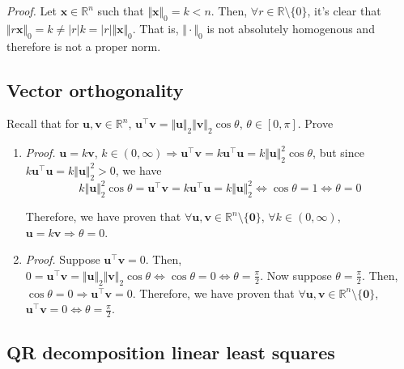 \documentclass{article}
\numberwithin{equation}{section}
\begin{document}
\textit{Proof.} Let $ \mathbf{x} \in \mathbb{R}^n $ such that
$ \Vert\mathbf{x}\Vert_0 = k < n $. Then, $ \forall r \in \mathbb{R} \setminus
\{0\} $, it's clear that $ \Vert r\mathbf{x}\Vert_0 = k \ne |r|k =
|r|\Vert\mathbf{x}\Vert_0 $. That is, $ \Vert\cdot\Vert_0 $ is not absolutely
homogenous and therefore is not a proper norm.

\subsection{Vector orthogonality}

Recall that for $ \mathbf{u}, \mathbf{v} \in \mathbb{R}^n $,
$ \mathbf{u}^\top\mathbf{v} = \Vert\mathbf{u}\Vert_2\Vert\mathbf{v}\Vert_2
\cos\theta $, $ \theta \in [0, \pi] $. Prove
\begin{enumerate}[label = \alph*.]
    \item
    \textit{Proof.} $ \mathbf{u} = k\mathbf{v} $, $ k \in (0, \infty)
    \Rightarrow \mathbf{u}^\top\mathbf{v} = k\mathbf{u}^\top\mathbf{u} =
    k\Vert\mathbf{u}\Vert_2^2\cos\theta $, but since $ k\mathbf{u}^\top
    \mathbf{u} = k\Vert\mathbf{u}\Vert_2^2 > 0 $, we have
    \begin{equation*}
        k\Vert\mathbf{u}\Vert_2^2\cos\theta = \mathbf{u}^\top\mathbf{v} =
        k\mathbf{u}^\top\mathbf{u} = k\Vert\mathbf{u}\Vert_2^2 \Leftrightarrow
        \cos\theta = 1 \Leftrightarrow \theta = 0
    \end{equation*}

    Therefore, we have proven that $ \forall \mathbf{u}, \mathbf{v} \in
    \mathbb{R}^n \setminus \{\mathbf{0}\} $, $ \forall k \in (0, \infty) $,
    $ \mathbf{u} = k\mathbf{v} \Rightarrow \theta = 0 $.

    \item
    \textit{Proof.} Suppose $ \mathbf{u}^\top\mathbf{v} = 0 $. Then,
    $ 0 = \mathbf{u}^\top\mathbf{v} = \Vert\mathbf{u}\Vert_2
    \Vert\mathbf{v}\Vert_2\cos\theta \Leftrightarrow \cos\theta = 0
    \Leftrightarrow \theta = \frac{\pi}{2} $. Now suppose
    $ \theta = \frac{\pi}{2} $. Then, $ \cos\theta = 0 \Rightarrow
    \mathbf{u}^\top\mathbf{v} = 0 $. Therefore, we have proven that
    $ \forall \mathbf{u}, \mathbf{v} \in \mathbb{R}^n \setminus
    \{\mathbf{0}\} $, $ \mathbf{u}^\top\mathbf{v} = 0 \Leftrightarrow
    \theta = \frac{\pi}{2} $.
\end{enumerate}

\medskip

\subsection{QR decomposition linear least squares}
\end{document}
